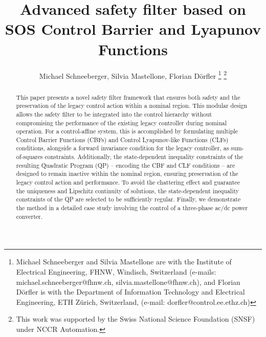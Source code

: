 \documentclass[lettersize,journal]{IEEEtran}
\newcommand{\afterReviewChangedBox}[1]{{\color{orange}#1}}
\begin{document}
\title{Advanced safety filter based on SOS Control Barrier and Lyapunov Functions}

\author{Michael Schneeberger, Silvia Mastellone, Florian D{\"o}rfler 
   \thanks{Michael Schneeberger and Silvia Mastellone are with the Institute of Electrical Engineering, FHNW, Windisch, Switzerland (e-mails: michael.schneeberger@fhnw.ch, silvia.mastellone@fhnw.ch), and Florian D{\"o}rfler is with the Department of Information Technology and Electrical Engineering, ETH Z{\"u}rich, Switzerland, (e-mail: dorfler@control.ee.ethz.ch)} %
   \thanks{This work was supported by the Swiss National Science Foundation (SNSF) under NCCR Automation.}
}

\maketitle

\begin{abstract}
This paper presents a novel safety filter framework that ensures both safety and the preservation of the legacy control action within a nominal region.
This modular design allows the safety filter to be integrated into the control hierarchy without compromising the performance of the existing legacy controller during nominal operation. 
\afterReviewChangedBox{For a control-affine system,} this is accomplished by formulating multiple Control Barrier Functions (CBFs) and Control Lyapunov-like Functions (CLFs) conditions, alongside a forward invariance condition for the legacy controller, as sum-of-squares constraints. %
Additionally, the state-dependent inequality constraints of the resulting Quadratic Program (QP) -- encoding the CBF and CLF conditions -- are designed to remain inactive within the nominal region, ensuring preservation of the legacy control action and performance.
To avoid the chattering effect and guarantee the uniqueness and Lipschitz continuity of solutions, the state-dependent inequality constraints of the QP are selected to be sufficiently regular.
Finally, we demonstrate the method in a detailed case study involving the control of a three-phase ac/dc power converter.
\end{abstract}
\end{document}
